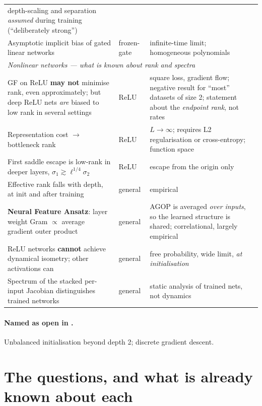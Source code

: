 \documentclass{article}
\theoremstyle{plain}\newtheorem{theorem}{Theorem}\newtheorem{lemma}[theorem]{Lemma}
\theoremstyle{definition}\newtheorem{definition}[theorem]{Definition}
\begin{document}
\begin{center}
\begin{tabular}{p{3.6cm}p{1.5cm}p{4.6cm}p{3.4cm}}
depth-scaling and separation \emph{assumed} during training (``deliberately strong'') & \cite{haas2026why} \\
Asymptotic implicit bias of gated linear networks & frozen-gate & infinite-time limit; homogeneous polynomials & \cite{gatedlinear2022implicit} \\
\midrule
\multicolumn{4}{l}{\emph{Nonlinear networks --- what is known about rank and spectra}}\\
\midrule
GF on ReLU \textbf{may not} minimise rank, even approximately; but deep ReLU nets \emph{are} biased to low rank in several settings & ReLU &
square loss, gradient flow; negative result for ``most'' datasets of size 2; statement about the \emph{endpoint rank}, not rates & \cite{timor2023implicit} \\
Representation cost $\to$ bottleneck rank & ReLU & $L\to\infty$; requires L2 regularisation or cross-entropy; function space & \cite{jacot2023implicit} \\
First saddle escape is low-rank in deeper layers, $\sigma_1\gtrsim\ell^{1/4}\sigma_2$ & ReLU & escape from the origin only & \cite{bantzis2025saddle} \\
Effective rank falls with depth, at init and after training & general & empirical & \cite{huh2021lowrank} \\
\textbf{Neural Feature Ansatz}: layer weight Gram $\propto$ average gradient outer product & general &
AGOP is averaged \emph{over inputs}, so the learned structure is shared; correlational, largely empirical & \cite{radhakrishnan2024mechanism,beaglehole2024agop} \\
ReLU networks \textbf{cannot} achieve dynamical isometry; other activations can & general &
free probability, wide limit, \emph{at initialisation} & \cite{pennington2017resurrecting} \\
Spectrum of the stacked per-input Jacobian distinguishes trained networks & general & static analysis of trained nets, not dynamics & \cite{wang2016extended} \\
\bottomrule
\end{tabular}
\end{center}

\paragraph{Named as open in \cite{cohen2024lectures}.} Unbalanced initialisation beyond depth 2;
discrete gradient descent.

\section{The questions, and what is already known about each}\label{sec:questions}
\end{document}

